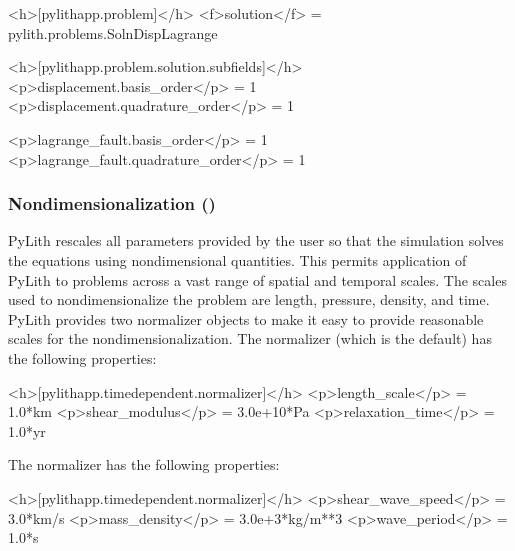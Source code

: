 \begin{cfg}
<h>[pylithapp.problem]</h>
<f>solution</f> = pylith.problems.SolnDispLagrange

<h>[pylithapp.problem.solution.subfields]</h>
<p>displacement.basis_order</p> = 1
<p>displacement.quadrature_order</p> = 1

<p>lagrange_fault.basis_order</p> = 1
<p>lagrange_fault.quadrature_order</p> = 1
\end{cfg}


\subsubsection{Nondimensionalization ()}

PyLith rescales all parameters provided by the user so that the
simulation solves the equations using nondimensional quantities.  This
permits application of PyLith to problems across a vast range of
spatial and temporal scales. The scales used to nondimensionalize the
problem are length, pressure, density, and time. PyLith provides two
normalizer objects to make it easy to provide reasonable scales for
the nondimensionalization. The 
normalizer (which is the default) has the following properties:
\begin{inventory}
\end{inventory}
\begin{cfg}
<h>[pylithapp.timedependent.normalizer]</h>
<p>length_scale</p> = 1.0*km
<p>shear_modulus</p> = 3.0e+10*Pa
<p>relaxation_time</p> = 1.0*yr
\end{cfg}
The  normalizer has the following
properties:
\begin{inventory}
\end{inventory}
\begin{cfg}
<h>[pylithapp.timedependent.normalizer]</h>
<p>shear_wave_speed</p> = 3.0*km/s
<p>mass_density</p> = 3.0e+3*kg/m**3
<p>wave_period</p> = 1.0*s
\end{cfg}

